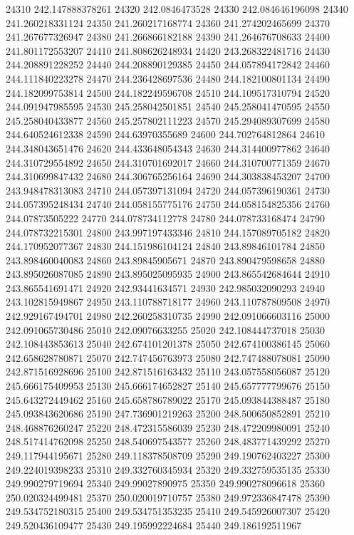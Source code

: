 {24310 242.147888378261
24320 242.0846473528
24330 242.084646196098
24340 241.260218331124
24350 241.260217168774
24360 241.274202465699
24370 241.267677326947
24380 241.266866182188
24390 241.264676708633
24400 241.801172553207
24410 241.808626248934
24420 243.268322481716
24430 244.208891228252
24440 244.208890129385
24450 244.057894172842
24460 244.111840223278
24470 244.236428697536
24480 244.182100801134
24490 244.182099753814
24500 244.182249596708
24510 244.109517310794
24520 244.091947985595
24530 245.258042501851
24540 245.258041470595
24550 245.258040433877
24560 245.257802111223
24570 245.294089307699
24580 244.640524612338
24590 244.63970355689
24600 244.702764812864
24610 244.348043651476
24620 244.433648054343
24630 244.314400977862
24640 244.310729554892
24650 244.310701692017
24660 244.310700771359
24670 244.310699847432
24680 244.306765256164
24690 244.303838453207
24700 243.948478313083
24710 244.057397131094
24720 244.057396190361
24730 244.057395248434
24740 244.058155775176
24750 244.058154825356
24760 244.07873505222
24770 244.078734112778
24780 244.078733168474
24790 244.078732215301
24800 243.997197433346
24810 244.157089705182
24820 244.170952077367
24830 244.151986104124
24840 243.89846101784
24850 243.898460040083
24860 243.89845905671
24870 243.890479598658
24880 243.895026087085
24890 243.895025095935
24900 243.865542684644
24910 243.865541691471
24920 242.93441634571
24930 242.985032090293
24940 243.102815949867
24950 243.110788718177
24960 243.110787809508
24970 242.929167494701
24980 242.260258310735
24990 242.091066603116
25000 242.091065730486
25010 242.09076633255
25020 242.108444737018
25030 242.108443853613
25040 242.674101201378
25050 242.674100386145
25060 242.658628780871
25070 242.747456763973
25080 242.747488078081
25090 242.871516928696
25100 242.871516163432
25110 243.057558056087
25120 245.666175409953
25130 245.666174652827
25140 245.657777799676
25150 245.643272449462
25160 245.658786789022
25170 245.093844388487
25180 245.093843620686
25190 247.736901219263
25200 248.500650852891
25210 248.468876260247
25220 248.472315586039
25230 248.472209980091
25240 248.517414762098
25250 248.540697543577
25260 248.483771439292
25270 249.117944195671
25280 249.118378508709
25290 249.190762403227
25300 249.224019398233
25310 249.332760345934
25320 249.332759535135
25330 249.990279719694
25340 249.99027890975
25350 249.990278096618
25360 250.020324499481
25370 250.020019710757
25380 249.972336847478
25390 249.534752180315
25400 249.534751353235
25410 249.545926007307
25420 249.520436109477
25430 249.195992224684
25440 249.186192511967
}
